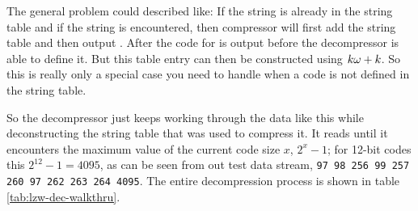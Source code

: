 \begin{refsection}
The general problem could described like: If the string \ko is already
in the string table and if the string \kokok is encountered, then
compressor will first add \kok the string table and then output
\ko. After the code for \kok is output before the decompressor is able
to define it. But this table entry can then be constructed using $k\omega
+k$.  So this is really only a special case you need to handle when a
code is not defined in the string table.

So the decompressor just keeps working through the data like this while
deconstructing the string table that was used to compress it. It reads
until it encounters the maximum value of the current code size $x$,
$2^{x}-1$; for 12-bit codes this $2^{12} - 1 = 4095$, as can be seen
from out test data stream, \texttt{97 98 256 99 257 260 97 262 263 264
  4095}. The entire decompression process is shown in table \ref{tab:lzw-dec-walkthru}.

\begin{table}
  \centering
  \noindent{}
  \caption{Detailed LZW decompression on the string \texttt{ababcbababaaaaaaa}.}
  \label{tab:lzw-dec-walkthru}
\end{table}


\end{refsection}
